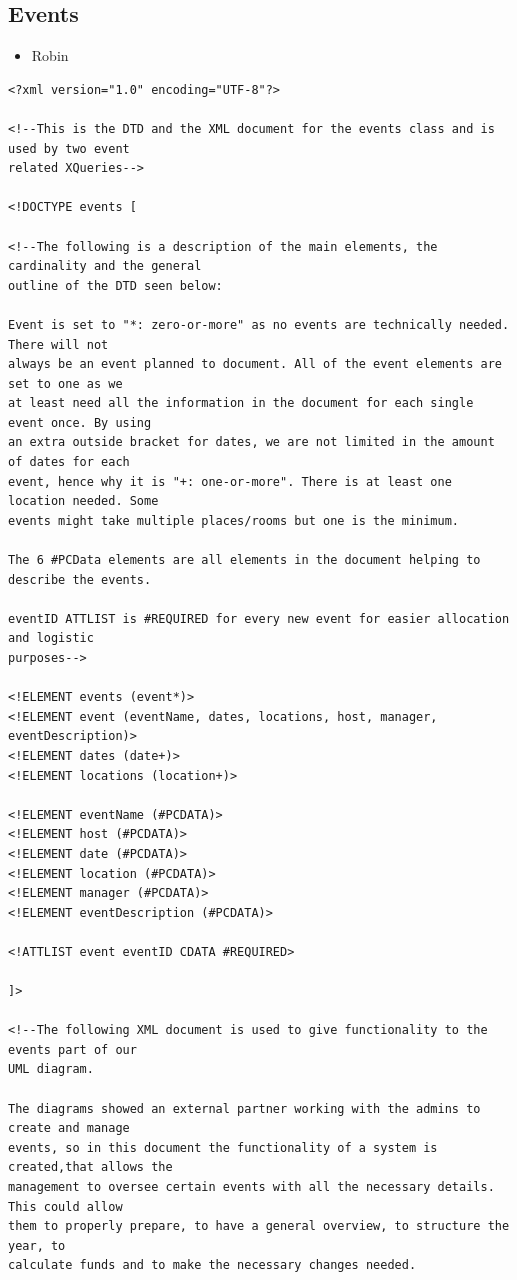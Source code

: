 \documentclass{article} %
\begin{document}
\subsection{Events}

\begin{itemize}
    \item Robin
\end{itemize}

\begin{verbatim}
<?xml version="1.0" encoding="UTF-8"?>

<!--This is the DTD and the XML document for the events class and is used by two event 
related XQueries-->

<!DOCTYPE events [

<!--The following is a description of the main elements, the cardinality and the general 
outline of the DTD seen below:

Event is set to "*: zero-or-more" as no events are technically needed. There will not 
always be an event planned to document. All of the event elements are set to one as we 
at least need all the information in the document for each single event once. By using
an extra outside bracket for dates, we are not limited in the amount of dates for each 
event, hence why it is "+: one-or-more". There is at least one location needed. Some 
events might take multiple places/rooms but one is the minimum.

The 6 #PCData elements are all elements in the document helping to describe the events.

eventID ATTLIST is #REQUIRED for every new event for easier allocation and logistic 
purposes-->

<!ELEMENT events (event*)>		
<!ELEMENT event (eventName, dates, locations, host, manager, eventDescription)>		
<!ELEMENT dates (date+)>		
<!ELEMENT locations (location+)>	

<!ELEMENT eventName (#PCDATA)>		
<!ELEMENT host (#PCDATA)>
<!ELEMENT date (#PCDATA)>
<!ELEMENT location (#PCDATA)>
<!ELEMENT manager (#PCDATA)>
<!ELEMENT eventDescription (#PCDATA)>

<!ATTLIST event eventID CDATA #REQUIRED>  	

]>

<!--The following XML document is used to give functionality to the events part of our 
UML diagram.

The diagrams showed an external partner working with the admins to create and manage 
events, so in this document the functionality of a system is created,that allows the 
management to oversee certain events with all the necessary details. This could allow 
them to properly prepare, to have a general overview, to structure the year, to 
calculate funds and to make the necessary changes needed.
    

\end{verbatim}
\end{document}
